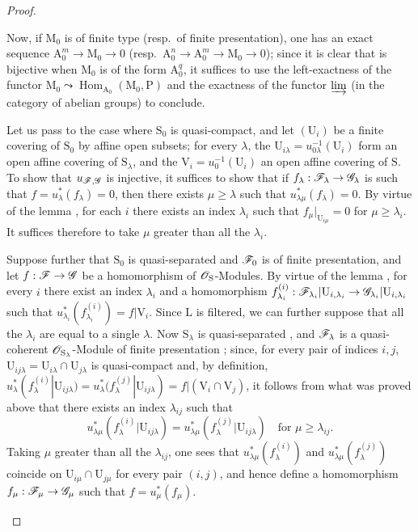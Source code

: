 \begin{proof}
\begin{enumerate}[label=(\roman*)]
Now, if $\mathrm{M}_0$ is of finite type (resp.\ of finite presentation), one has an exact sequence $\mathrm{A}_0^m\to\mathrm{M}_0\to 0$ (resp.\ $\mathrm{A}_0^n\to\mathrm{A}_0^m\to\mathrm{M}_0\to 0$); since it is clear that  is bijective when $\mathrm{M}_0$ is of the form $\mathrm{A}_0^q$, it suffices to use the left-exactness of the functor $\mathrm{M}_0\leadsto\operatorname{Hom}_{\mathrm{A}_0}(\mathrm{M}_0,\mathrm{P})$ and the exactness of the functor $\varinjlim$ (in the category of abelian groups) to conclude.

\medskip
Let us pass to the case where $\mathrm{S}_0$ is quasi-compact, and let $(\mathrm{U}_i)$ be a finite covering of $\mathrm{S}_0$ by affine open subsets; for every $\lambda$, the $\mathrm{U}_{i\lambda}=u_{0\lambda}^{-1}(\mathrm{U}_i)$ form an open affine covering of $\mathrm{S}_\lambda$, and the $\mathrm{V}_i=u_0^{-1}(\mathrm{U}_i)$ an open affine covering of $\mathrm{S}$.
To show that $u_{\mathscr{F},\mathscr{G}}$ is injective, it suffices to show that if $f_\lambda:\mathscr{F}_\lambda\to\mathscr{G}_\lambda$ is such that $f=u_\lambda^*(f_\lambda)=0$, then there exists $\mu\geqslant\lambda$ such that $u_{\lambda\mu}^*(f_\lambda)=0$.
By virtue of the lemma , for each $i$ there exists an index $\lambda_i$ such that $f_\mu|_{\mathrm{U}_{i\mu}}=0$ for $\mu\geqslant\lambda_i$.
It suffices therefore to take $\mu$ greater than all the $\lambda_i$.

Suppose further that $\mathrm{S}_0$ is quasi-separated and $\mathscr{F}_0$ is of finite presentation, and let $f:\mathscr{F}\to\mathscr{G}$ be a homomorphism of $\mathscr{O}_\mathrm{S}$-Modules.
By virtue of the lemma , for every $i$ there exist an index $\lambda_i$ and a homomorphism $f_{\lambda_i}^{(i)}:\mathscr{F}_{\lambda_i}|\mathrm{U}_{i,\lambda_i}\to\mathscr{G}_{\lambda_i}|\mathrm{U}_{i,\lambda_i}$ such that $u_{\lambda_i}^*(f_{\lambda_i}^{(i)})=f|\mathrm{V}_i$.
Since $\mathrm{L}$ is filtered, we can further suppose that all the $\lambda_i$ are equal to a single $\lambda$.
Now $\mathrm{S}_\lambda$ is quasi-separated , and $\mathscr{F}_\lambda$ is a quasi-coherent $\mathscr{O}_{\mathrm{S}_\lambda}$-Module of finite presentation ; since, for every pair of indices $i,j$, $\mathrm{U}_{ij\lambda}=\mathrm{U}_{i\lambda}\cap\mathrm{U}_{j\lambda}$ is quasi-compact and, by definition, $u_\lambda^*(f_\lambda^{(i)}|\mathrm{U}_{ij\lambda})=u_\lambda^*(f_\lambda^{(j)}|\mathrm{U}_{ij\lambda})=f|(\mathrm{V}_i\cap\mathrm{V}_j)$,
it follows from what was proved above that there exists an index $\lambda_{ij}$ such that
\[
  u_{\lambda\mu}^*(f_\lambda^{(i)}|\mathrm{U}_{ij\lambda})=u_{\lambda\mu}^*(f_\lambda^{(j)}|\mathrm{U}_{ij\lambda})\quad\text{for }\mu\geqslant\lambda_{ij}.
\]
Taking $\mu$ greater than all the $\lambda_{ij}$, one sees that $u_{\lambda\mu}^*(f_\lambda^{(i)})$ and $u_{\lambda\mu}^*(f_\lambda^{(j)})$ coincide on $\mathrm{U}_{i\mu}\cap\mathrm{U}_{j\mu}$ for every pair $(i,j)$, and hence define a homomorphism $f_\mu:\mathscr{F}_\mu\to\mathscr{G}_\mu$ such that $f=u_\mu^*(f_\mu)$.

\end{enumerate}
\end{proof}

